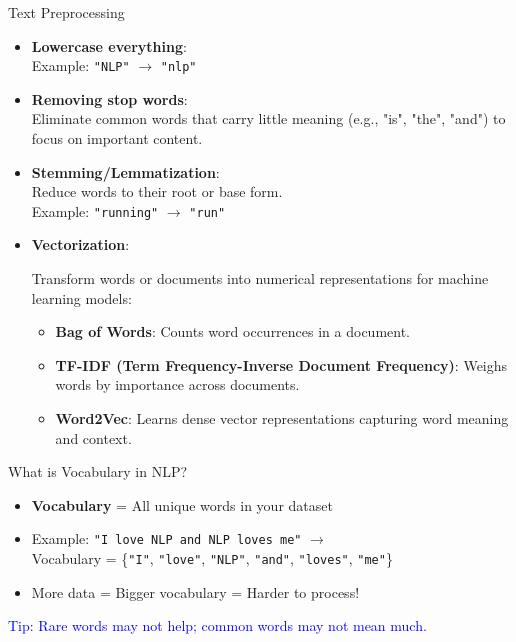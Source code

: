\begin{frame}{Text Preprocessing}
    \begin{itemize}
        \item \textbf{Lowercase everything}: \\
        {\small Example: \texttt{"NLP"} $\rightarrow$ \texttt{"nlp"}}
        \item \textbf{Removing stop words}: \\
        {\small Eliminate common words that carry little meaning (e.g., "is", "the", "and") to focus on important content.}
        \item \textbf{Stemming/Lemmatization}: \\
        {\small Reduce words to their root or base form. \\
        Example: \texttt{"running"} $\rightarrow$ \texttt{"run"}}
        \item \textbf{Vectorization}: \\
        {\small Transform words or documents into numerical representations for machine learning models:
        \begin{itemize}
            \item \textbf{Bag of Words}: Counts word occurrences in a document.
            \item \textbf{TF-IDF (Term Frequency-Inverse Document Frequency)}: Weighs words by importance across documents.
            \item \textbf{Word2Vec}: Learns dense vector representations capturing word meaning and context.
        \end{itemize}}
    \end{itemize}
\end{frame}

\begin{frame}{What is Vocabulary in NLP?}
    \begin{itemize}
        \item \textbf{Vocabulary} = All unique words in your dataset
        \item Example: \texttt{"I love NLP and NLP loves me"} $\rightarrow$ \\
        Vocabulary = \{\texttt{"I"}, \texttt{"love"}, \texttt{"NLP"}, \texttt{"and"}, \texttt{"loves"}, \texttt{"me"}\}
        \item More data = Bigger vocabulary = Harder to process!
    \end{itemize}
    \vspace{1em}
    \textcolor{blue}{\faLightbulbO\enspace Tip: Rare words may not help; common words may not mean much.}
\end{frame}

